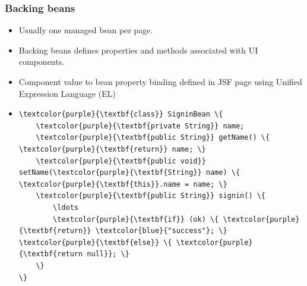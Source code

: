 \documentclass[10pt,xcolor=pdflatex]{beamer}
\begin{document}
\begin{frame}[fragile]\frametitle{Backing beans}
	\begin{itemize}
		\item Usually one managed bean per page.
		\item Backing beans defines properties and methods associated with UI components.
		\item Component value to bean property binding defined in JSF page using Unified Expression Language (EL)
		\item[]
        	\medskip
            \begin{Verbatim}[fontsize=\scriptsize, commandchars=\\\{\}]
\textcolor{purple}{\textbf{class}} SigninBean \{
    \textcolor{purple}{\textbf{private String}} name;
    \textcolor{purple}{\textbf{public String}} getName() \{ \textcolor{purple}{\textbf{return}} name; \} 
    \textcolor{purple}{\textbf{public void}} setName(\textcolor{purple}{\textbf{String}} name) \{ \textcolor{purple}{\textbf{this}}.name = name; \}
    \textcolor{purple}{\textbf{public String}} signin() \{
        \ldots
        \textcolor{purple}{\textbf{if}} (ok) \{ \textcolor{purple}{\textbf{return}} \textcolor{blue}{"success"}; \} \textcolor{purple}{\textbf{else}} \{ \textcolor{purple}{\textbf{return null}}; \}
    \}
\}
			\end{Verbatim}
	\end{itemize}
\end{frame}
\end{document}
